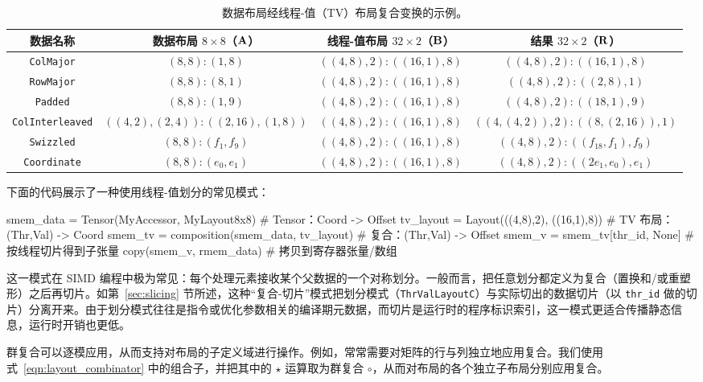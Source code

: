 \begin{table}[ht]
\centering
\begin{tabular}{|c|c|c|c|}
数据名称 & 数据布局 $8 {\times} 8$（$\mathbf{A}$） & 线程-值布局 $32 {\times} 2$（$\mathbf{B}$） & 结果 $32 {\times} 2$（$\mathbf{R}$） \\ \hline \hline
{\tt ColMajor} & $(8,8):(1,8)$ & $((4,8),2):((16,1),8)$ & $((4,8),2):((16,1),8)$ \\ \hline
{\tt RowMajor} & $(8,8):(8,1)$ & $((4,8),2):((16,1),8)$ & $((4,8),2):((2,8),1)$ \\ \hline
{\tt Padded} & $(8,8):(1,9)$ & $((4,8),2):((16,1),8)$ & $((4,8),2):((18,1),9)$ \\ \hline
{\tt ColInterleaved} & $((4,2),(2,4)):((2,16),(1,8))$ & $((4,8),2):((16,1),8)$ & $((4,(4,2)),2):((8,(2,16)),1)$ \\ \hline
{\tt Swizzled} & $(8,8):(f_1,f_9)$ & $((4,8),2):((16,1),8)$ & $((4,8),2):((f_{18},f_1),f_9)$ \\ \hline
{\tt Coordinate} & $(8,8):(e_0,e_1)$ & $((4,8),2):((16,1),8)$ & $((4,8),2):((2e_1,e_0),e_1)$ \\ \hline
\end{tabular}
\caption{数据布局经线程-值（TV）布局复合变换的示例。}
\label{tab:TVLayoutExamples}
\end{table}

下面的代码展示了一种使用线程-值划分的常见模式：
\begin{python}
smem_data = Tensor(MyAccessor, MyLayout8x8)     # Tensor：Coord -> Offset
tv_layout   = Layout(((4,8),2), ((16,1),8))     # TV 布局：(Thr,Val) -> Coord
smem_tv     = composition(smem_data, tv_layout) # 复合：(Thr,Val) -> Offset
smem_v      = smem_tv[thr_id, None]             # 按线程切片得到子张量
copy(smem_v, rmem_data)                         # 拷贝到寄存器张量/数组
\end{python}
这一模式在 SIMD 编程中极为常见：每个处理元素接收某个父数据的一个对称划分。一般而言，\CuTe 把任意划分都定义为复合（置换和/或重塑形）之后再切片。如第~\ref{sec:slicing} 节所述，这种“复合-切片”模式把划分模式（{\tt ThrValLayoutC}）与实际切出的数据切片（以 {\tt thr\_id} 做的切片）分离开来。由于划分模式往往是指令或优化参数相关的编译期元数据，而切片是运行时的程序标识索引，这一模式更适合传播静态信息，运行时开销也更低。

\label{sec:tiler}

群复合可以逐模应用，从而支持对布局的子定义域进行操作。例如，常常需要对矩阵的行与列独立地应用复合。我们使用式~\eqref{eqn:layout_combinator} 中的组合子，并把其中的 $\star$ 运算取为群复合 $\circ$，从而对布局的各个独立子布局分别应用复合。


